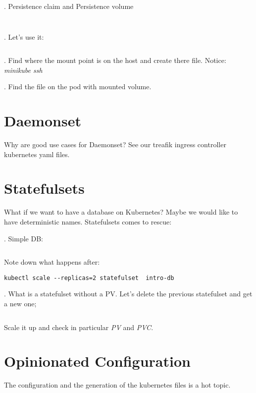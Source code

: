 \documentclass[12pt, letterpaper]{article}
\begin{document}
. Persistence claim and Persistence volume

\inputminted[frame=single]{yaml}{introduction/persistentvolumes/pv.yaml}

\inputminted[frame=single]{yaml}{introduction/persistentvolumes/pvc.yaml}

. Let's use it:

\inputminted[frame=single]{yaml}{introduction/persistentvolumes/kube-deployment.yaml}

. Find where the mount point is on the host and create there file. Notice: \emph{minikube ssh}

. Find the file on the pod with mounted volume.

\section{Daemonset}
Why are good use cases for Daemonset? See our treafik ingress controller kubernetes yaml files.

\section{Statefulsets}
What if we want to have a database on Kubernetes? Maybe we would like to have deterministic names. Statefulsets comes to rescue:

. Simple DB:

\inputminted[frame=single]{yaml}{introduction/statefulsets/kube-statefulsets.yaml}

\bigskip
Note down what happens after:

\begin{verbatim}
kubectl scale --replicas=2 statefulset  intro-db
\end{verbatim}


. What is a statefulset without a PV. Let's delete the previous statefulset and get a new one;

\inputminted[frame=single]{yaml}{introduction/statefulsets/kube-statefulsets-vct.yaml}

\bigskip
Scale it up and check in particular \emph{PV} and \emph{PVC}.

%
\section{Opinionated Configuration}
The configuration and the generation of the kubernetes files is a hot topic.
\end{document}
